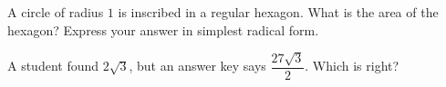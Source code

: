 A circle of radius $1$ is inscribed in a regular hexagon. What is the area of the hexagon? Express your answer in simplest radical form.

A student found $2\sqrt3$, but an answer key says $\dfrac{27\sqrt3}{2}$. Which is right?
